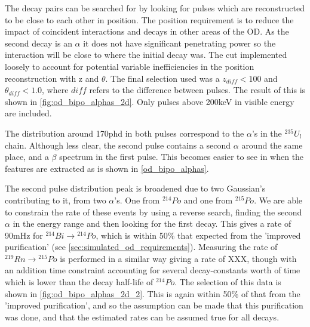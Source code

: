 \par
The decay pairs can be searched for by looking for pulses which are reconstructed to be close to each other in position.
The position requirement is to reduce the impact of coincident interactions and decays in other areas of the OD.
As the second decay is an $\alpha$ it does not have significant penetrating power so the interaction will be close to where the initial decay was.
The cut implemented loosely to account for potential variable inefficiencies in the position reconstruction with z and $\theta$.
The final selection used was a $z_{diff} < 100$ and $\theta_{diff} < 1.0$, where $diff$ refers to the difference between pulses.
The result of this is shown in \autoref{fig:od_bipo_alphas_2d}.
Only pulses above 200keV in visible energy are included.



\par
The distribution around 170phd in both pulses correspond to the $\alpha$'s in the ${}^{235}U_{l}$ chain.
Although less clear, the second pulse contains a second $\alpha$ around the same place, and a $\beta$ spectrum in the first pulse.
This becomes easier to see in when the features are extracted as is shown in \autoref{od_bipo_alphas}.



\par
The second pulse distribution peak is broadened due to two Gaussian's contributing to it, from two $\alpha$'s.
One from ${}^{214}Po$ and one from ${}^{215}Po$.
We are able to constrain the rate of these events by using a reverse search, finding the second $\alpha$ in the energy range and then looking for the first decay.
This gives a rate of 90mHz for ${}^{214}Bi \to {}^{214}Po$, which is within 50\% that expected from the 'improved purification' (see \autoref{sec:simulated_od_requirements}).
Measuring the rate of ${}^{219}Rn \to {}^{215}Po$ is performed in a similar way giving a rate of XXX, though with an addition time constraint accounting for several decay-constants worth of time which is lower than the decay half-life of ${}^{214}Po$.
The selection of this data is shown in \autoref{fig:od_bipo_alphas_2d_2}.
This is again within 50\% of that from the 'improved purification', and so the assumption can be made that this purification was done, and that the estimated rates can be assumed true for all decays.


